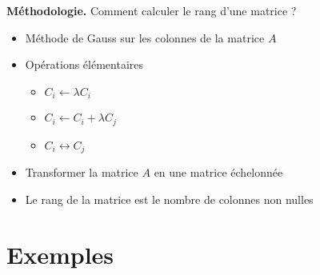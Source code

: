 \begin{frame}
\textbf{Méthodologie.} Comment calculer le rang d'une matrice ?

\pause
\begin{itemize}
  \item Méthode de Gauss sur les colonnes de la matrice $A$

\pause  
  \item Opérations élémentaires
  \begin{itemize}
    \item $C_i \leftarrow \lambda C_i$
    \item $C_i \leftarrow C_i+\lambda C_j$
    \item $C_i \leftrightarrow C_j$
  \end{itemize}

\pause  
  \item Transformer la matrice $A$ en une matrice échelonnée

\pause  
  \item Le rang de la matrice est le nombre de colonnes non nulles
\end{itemize}

\end{frame}


\section{Exemples}

